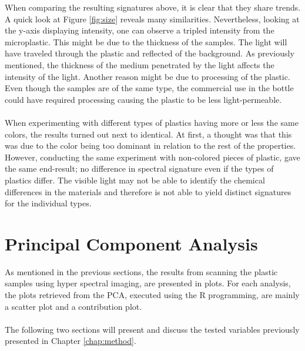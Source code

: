 \noindent
When comparing the resulting signatures above, it is clear that they share trends. A quick look at Figure \ref{fig:size} reveals many similarities. Nevertheless, looking at the y-axis displaying intensity, one can observe a tripled intensity from the microplastic. This might be due to the thickness of the samples. The light will have traveled through the plastic and reflected of the background. As previously mentioned, the thickness of the medium penetrated by the light affects the intensity of the light. Another reason might be due to processing of the plastic. Even though the samples are of the same type, the commercial use in the bottle could have required processing causing the plastic to be less light-permeable.
\\\\
When experimenting with different types of plastics having more or less the same colors, the results turned out next to identical. At first, a thought was that this was due to the color being too dominant in relation to the rest of the properties. However, conducting the same experiment with non-colored pieces of plastic, gave the same end-result; no difference in spectral signature even if the types of plastics differ. The visible light may not be able to identify the chemical differences in the materials and therefore is not able to yield distinct signatures for the individual types.

\vspace{1.3cm}
\section{Principal Component Analysis}

As mentioned in the previous sections, the results from scanning the plastic samples using hyper spectral imaging, are presented in plots. For each analysis, the plots retrieved from the PCA, executed using the R programming, are mainly a scatter plot and a contribution plot. 
\\\\
The following two sections will present and discuss the tested variables previously presented in Chapter \ref{chap:method}. 

